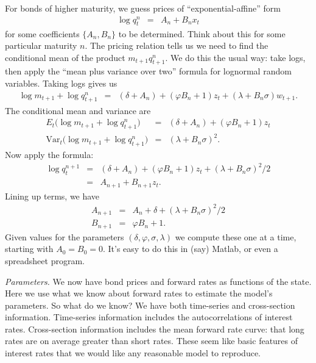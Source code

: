 \documentclass[11pt]{article}
\begin{document}
For bonds of higher maturity, we
guess prices of ``exponential-affine'' form
\begin{eqnarray*}
    \log q^n_t &=& A_n + B_n x_t
\end{eqnarray*}
for some coefficients $\{ A_n, B_n\}$ to be determined.
Think about this for some particular maturity $n$.
The pricing relation tells us we
need to find the conditional mean of the product
$m_{t+1} q^n_{t+1}$.
We do this the usual way:  take logs,
then apply the ``mean plus variance over two'' formula for
lognormal random variables.
Taking logs gives us
\begin{eqnarray*}
    \log m_{t+1} + \log q^{n}_{t+1} &=&
            (\delta + A_n) + (\varphi B_n +1) z_t + (\lambda + B_n \sigma) w_{t+1} .
\end{eqnarray*}
The conditional mean and variance are
\begin{eqnarray*}
   E_t \big( \log m_{t+1} + \log q^{n}_{t+1} \big) &=&
            (\delta + A_n) + (\varphi B_n + 1) z_t \\
   \mbox{Var}_t \big( \log m_{t+1} + \log q^{n}_{t+1} \big) &=&
            (\lambda + B_n \sigma)^2 .
\end{eqnarray*}
Now apply the formula:
\begin{eqnarray*}
    \log q^{n+1}_t &=&
            (\delta + A_n) + (\varphi B_n + 1) z_t + (\lambda + B_n \sigma)^2/2 \\
                &=& A_{n+1} + B_{n+1} z_t.
\end{eqnarray*}
Lining up terms, we have
\begin{eqnarray*}
    A_{n+1} &=& A_n + \delta + (\lambda + B_n\sigma)^2/2 \\
    B_{n+1} &=& \varphi B_n + 1 .
\end{eqnarray*}
Given values for the parameters $(\delta, \varphi, \sigma, \lambda)$
we compute these one at a time,
starting with $A_0 = B_0 = 0$.
It's easy to do this in (say) Matlab, or even a spreadsheet program.

{\it Parameters.\/}
We now have bond prices and forward rates as functions of the state.
Here we use what we know about forward rates
to estimate the model's parameters.
So what do we know?
We have both time-series and cross-section information.
Time-series information includes the autocorrelations
of interest rates.
Cross-section information includes the mean forward rate curve:
that long rates are on average greater than short rates.
These seem like basic features of interest rates that
we would like any reasonable model to reproduce.
\end{document}
